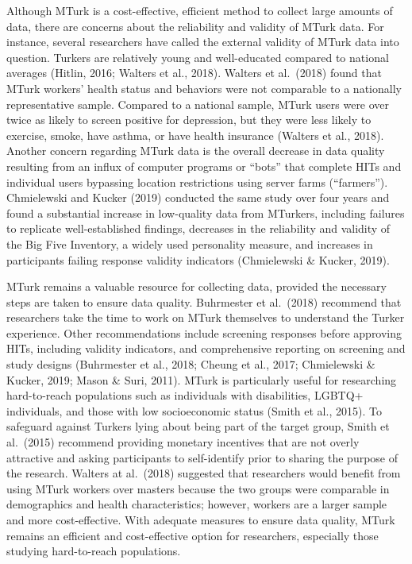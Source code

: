 \documentclass[
  11pt,
]{book}
\begin{document}
Although MTurk is a cost-effective, efficient method to collect large amounts of data, there are concerns about the reliability and validity of MTurk data. For instance, several researchers have called the external validity of MTurk data into question. Turkers are relatively young and well-educated compared to national averages (Hitlin, 2016; Walters et al., 2018). Walters et al.~(2018) found that MTurk workers' health status and behaviors were not comparable to a nationally representative sample. Compared to a national sample, MTurk users were over twice as likely to screen positive for depression, but they were less likely to exercise, smoke, have asthma, or have health insurance (Walters et al., 2018). Another concern regarding MTurk data is the overall decrease in data quality resulting from an influx of computer programs or ``bots'' that complete HITs and individual users bypassing location restrictions using server farms (``farmers''). Chmielewski and Kucker (2019) conducted the same study over four years and found a substantial increase in low-quality data from MTurkers, including failures to replicate well-established findings, decreases in the reliability and validity of the Big Five Inventory, a widely used personality measure, and increases in participants failing response validity indicators (Chmielewski \& Kucker, 2019).

MTurk remains a valuable resource for collecting data, provided the necessary steps are taken to ensure data quality. Buhrmester et al.~(2018) recommend that researchers take the time to work on MTurk themselves to understand the Turker experience. Other recommendations include screening responses before approving HITs, including validity indicators, and comprehensive reporting on screening and study designs (Buhrmester et al., 2018; Cheung et al., 2017; Chmielewski \& Kucker, 2019; Mason \& Suri, 2011). MTurk is particularly useful for researching hard-to-reach populations such as individuals with disabilities, LGBTQ+ individuals, and those with low socioeconomic status (Smith et al., 2015). To safeguard against Turkers lying about being part of the target group, Smith et al.~(2015) recommend providing monetary incentives that are not overly attractive and asking participants to self-identify prior to sharing the purpose of the research. Walters at al.~(2018) suggested that researchers would benefit from using MTurk workers over masters because the two groups were comparable in demographics and health characteristics; however, workers are a larger sample and more cost-effective. With adequate measures to ensure data quality, MTurk remains an efficient and cost-effective option for researchers, especially those studying hard-to-reach populations.
\end{document}
